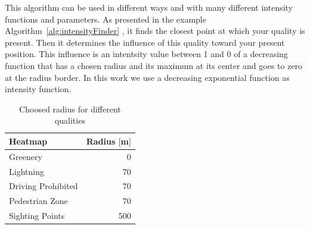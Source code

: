 \documentclass[letterpaper]{article}
\begin{document}
\indent This algorithm can be used in different ways and with many different intensity functions and parameters.
As presented in the example Algorithm~\ref{alg:intensityFinder} , it finds the closest point at which your quality
is present. Then it determines the influence of this quality toward your present position. This influence is an intentsity
value between 1 and 0 of a decreasing function that has a chosen radius and its maximum at its center and goes to zero
at the radius border. In this work we use a decreasing exponential function as intensity function.

\begin{table}[htb]
    \centering
        \begin{tabular}{lr}
            Heatmap & Radius $[$m$]$\\\hline
            Greenery & 0\\
            Lightning & 70\\
            Driving Prohibited & 70\\
            Pedestrian Zone & 70\\
            Sighting Points & 500\\
    \end{tabular}
    \caption{Choosed radius for different qualities}
    \label{table:RadiusParam}
\end{table}
\end{document}
